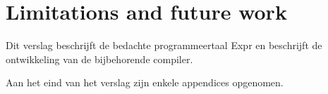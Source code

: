 \chapter{Limitations and future work}
Dit verslag beschrijft de bedachte programmeertaal Expr en beschrijft de
ontwikkeling van de bijbehorende compiler.

Aan het eind van het verslag zijn enkele appendices opgenomen. 
